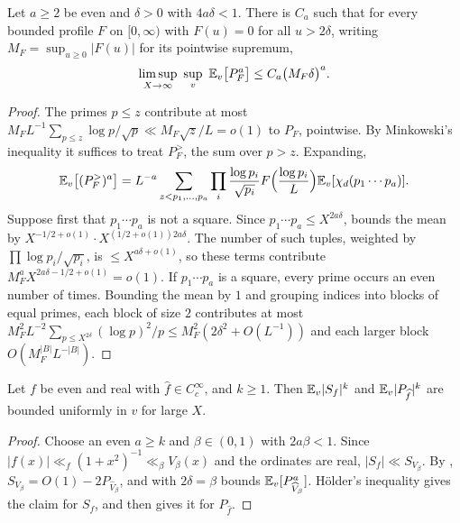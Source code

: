 \documentclass[11pt,colorlinks]{charlie}
\begin{document}
\begin{lemma}\label{lem:lowfreq}
Let $a\ge2$ be even and $\delta>0$ with $4a\delta<1$. There is $C_a$ such that for every bounded profile $F$ on $[0,\infty)$ with $F(u)=0$ for all $u>2\delta$, writing $M_F=\sup_{u\ge0}|F(u)|$ for its pointwise supremum,
\[
 \limsup_{X\to\infty}\ \sup_v\ \E_v\big[P_F^a\big]\le C_a\big(M_F\delta\big)^a .
\]
\end{lemma}
\begin{proof}
The primes $p\le z$ contribute at most $M_F L^{-1}\sum_{p\le z}\log p/\sqrt p\ll M_F\sqrt z/L=o(1)$ to $P_F$, pointwise. By Minkowski's inequality it suffices to treat $P_F^{>}$, the sum over $p>z$. Expanding,
\[
 \mathbb{E}_v\big[(P_F^{>})^a\big]=L^{-a}\sum_{z<p_1,\dots,p_a}\prod_i\frac{\log p_i}{\sqrt{p_i}}F\Big(\frac{\log p_i}L\Big)\mathbb{E}_v[\chi_d(p_1\cdots p_a)].
\]
Suppose first that $p_1\cdots p_a$ is not a square. Since $p_1\cdots p_a\le X^{2a\delta}$,  bounds the mean by $X^{-1/2+o(1)}\cdot X^{(1/2+o(1))2a\delta}$. The number of such tuples, weighted by $\prod\log p_i/\sqrt{p_i}$, is $\le X^{a\delta+o(1)}$, so these terms contribute $M_F^aX^{2a\delta-1/2+o(1)}=o(1)$. If $p_1\cdots p_a$ is a square, every prime occurs an even number of times. Bounding the mean by $1$ and grouping indices into blocks of equal primes, each block of size $2$ contributes at most $M_F^2L^{-2}\sum_{p\le X^{2\delta}}(\log p)^2/p\le M_F^2(2\delta^2+O(L^{-1}))$ and each larger block $O(M_F^{|B|}L^{-|B|})$.
\end{proof}

\begin{lemma}\label{lem:bounded}
Let $f$ be even and real with $\widehat f\in C_c^\infty$, and $k\ge1$. Then $\mathbb{E}_v|S_f|^k$ and $\mathbb{E}_v|P_{\widehat f}|^k$ are bounded uniformly in $v$ for large $X$.
\end{lemma}
\begin{proof}
Choose an even $a\ge k$ and $\beta\in(0,1)$ with $2a\beta<1$. Since $|f(x)|\ll_f(1+x^2)^{-1}\ll_\beta V_\beta(x)$ and the ordinates are real, $|S_f|\ll S_{V_\beta}$. By , $S_{V_\beta}=O(1)-2P_{\widehat V_\beta}$, and  with $2\delta=\beta$ bounds $\mathbb{E}_v[P_{\widehat V_\beta}^a]$. Hölder's inequality gives the claim for $S_f$, and  then gives it for $P_{\widehat f}$.
\end{proof}
\end{document}
